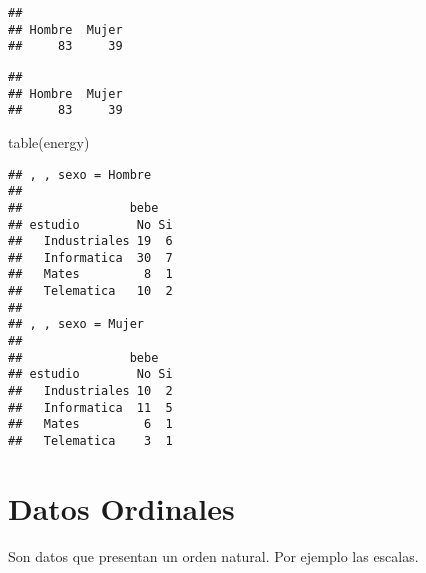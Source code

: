 \documentclass[
]{article}
\newenvironment{Shaded}{\begin{snugshade}}{\end{snugshade}}
\newcommand{\AttributeTok}[1]{\textcolor[rgb]{0.77,0.63,0.00}{#1}}
\newcommand{\CommentTok}[1]{\textcolor[rgb]{0.56,0.35,0.01}{\textit{#1}}}
\newcommand{\DecValTok}[1]{\textcolor[rgb]{0.00,0.00,0.81}{#1}}
\newcommand{\FunctionTok}[1]{\textcolor[rgb]{0.00,0.00,0.00}{#1}}
\newcommand{\NormalTok}[1]{#1}
\newcommand{\SpecialCharTok}[1]{\textcolor[rgb]{0.00,0.00,0.00}{#1}}
\begin{document}
\begin{Shaded}
\end{Shaded}

\begin{verbatim}
## 
## Hombre  Mujer 
##     83     39
\end{verbatim}

\begin{Shaded}
\end{Shaded}

\begin{verbatim}
## 
## Hombre  Mujer 
##     83     39
\end{verbatim}

\begin{Shaded}
\begin{Highlighting}[]
\FunctionTok{table}\NormalTok{(energy)}
\end{Highlighting}
\end{Shaded}

\begin{verbatim}
## , , sexo = Hombre
## 
##               bebe
## estudio        No Si
##   Industriales 19  6
##   Informatica  30  7
##   Mates         8  1
##   Telematica   10  2
## 
## , , sexo = Mujer
## 
##               bebe
## estudio        No Si
##   Industriales 10  2
##   Informatica  11  5
##   Mates         6  1
##   Telematica    3  1
\end{verbatim}

\hypertarget{datos-ordinales}{%
\section{Datos Ordinales}\label{datos-ordinales}}

Son datos que presentan un orden natural. Por ejemplo las escalas.
\end{document}
